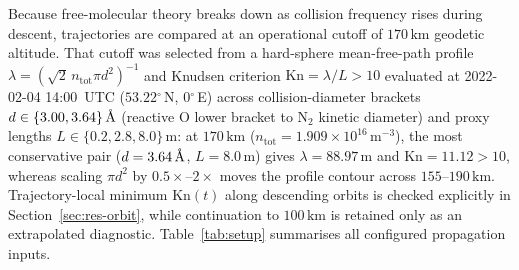 \documentclass[12pt]{article}
\newcommand{\unit}[1]{\,\mathrm{#1}}
\newcommand{\degree}{\ensuremath{{}^\circ}}
\begin{document}
Because free-molecular theory breaks down as collision frequency rises during descent, trajectories are compared at an operational cutoff of $170\unit{km}$ geodetic altitude. That cutoff was selected from a hard-sphere mean-free-path profile $\lambda = (\sqrt{2}\,n_{\mathrm{tot}}\pi d^2)^{-1}$ and Knudsen criterion $\mathrm{Kn} = \lambda / L > 10$ evaluated at 2022-02-04 14:00~UTC ($53.22\degree$\,N, $0\degree$\,E) across collision-diameter brackets $d \in \{3.00, 3.64\}\,\text{\normalfont\AA}$ (reactive $\mathrm{O}$ lower bracket to $\mathrm{N_2}$ kinetic diameter) and proxy lengths $L \in \{0.2, 2.8, 8.0\}\unit{m}$: at $170\unit{km}$ ($n_{\mathrm{tot}} = 1.909\times10^{16}\unit{m^{-3}}$), the most conservative pair ($d = 3.64\,\text{\normalfont\AA}$, $L = 8.0\unit{m}$) gives $\lambda = 88.97\unit{m}$ and $\mathrm{Kn} = 11.12 > 10$, whereas scaling $\pi d^2$ by $0.5\times$--$2\times$ moves the profile contour across $155$--$190\unit{km}$. Trajectory-local minimum $\mathrm{Kn}(t)$ along descending orbits is checked explicitly in Section~\ref{sec:res-orbit}, while continuation to $100\unit{km}$ is retained only as an extrapolated diagnostic. Table~\ref{tab:setup} summarises all configured propagation inputs.
\end{document}

